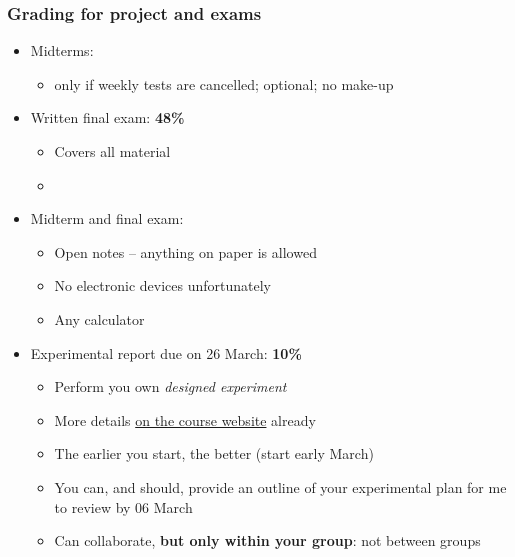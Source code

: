 \begin{frame}\frametitle{Grading for project and exams}
	\begin{itemize}
		\item	Midterms:
		\begin{itemize}
			\item	only if weekly tests are cancelled; optional; no make-up 
		\end{itemize}
	\end{itemize}
	\begin{itemize}
		\item	Written final exam: \textbf{48\%} 
		\begin{itemize}
			\item	Covers all material 
			\item	\textbf{{\color{myRed}{You must achieve 50\% or greater in final exam to pass 4C3/6C3}}}
		\end{itemize}
	\end{itemize}
	\begin{itemize}
		\item	Midterm and final exam: 
		\begin{itemize}
			\item	Open notes -- anything on paper is allowed 
			\item	No electronic devices unfortunately 
			\item	Any calculator 
		\end{itemize}
	\end{itemize}
	\begin{itemize}
		\item	Experimental report due on 26 March: \textbf{10\%} 
		\begin{itemize}
			\item	Perform you own \emph{designed experiment} 
			\item	More details \href{http://learnche.mcmaster.ca/4C3/Designed_experiments_project_-_2013}{on the course website} already
			\item	The earlier you start, the better (start early March)
			\item	You can, and should, provide an outline of your experimental plan for me to review by 06 March 
			\item	Can collaborate, \textbf{but only within your group}: not between groups 
		\end{itemize}
	\end{itemize}
\end{frame}

